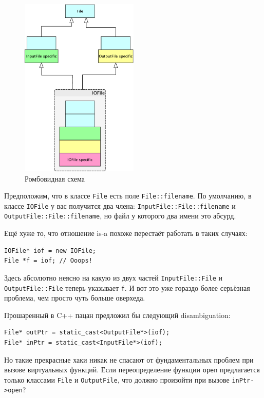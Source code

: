 \documentclass[a4paper,12pt,oneside]{article}
\begin{document}
\begin{figure}[h!]
\centering
\includegraphics[width=0.5\textwidth]{illustrations/romb-crop.pdf}
\caption{Ромбовидная схема}
\label{fig:romb-crop}
\end{figure}

Предположим, что в классе \lstinline!File! есть поле \lstinline!File::filename!. По умолчанию, в классе \lstinline!IOFile! у вас получится два члена: \lstinline!InputFile::File::filename! и \lstinline!OutputFile::File::filename!, но файл у которого два имени это абсурд. 

Ещё хуже то, что отношение is-a похоже перестаёт работать в таких случаях:

\begin{lstlisting}
IOFile* iof = new IOFile;
File *f = iof; // Ooops!
\end{lstlisting}

Здесь абсолютно неясно на какую из двух частей \lstinline!InputFile::File! и \lstinline!OutputFile::File! теперь указывает \lstinline!f!. И вот это уже гораздо более серьёзная проблема, чем просто чуть больше оверхеда.

Прошаренный в C++ пацан предложил бы следующий disambiguation:

\begin{lstlisting}
File* outPtr = static_cast<OutputFile*>(iof);
File* inPtr = static_cast<InputFile*>(iof);
\end{lstlisting}

Но такие прекрасные хаки никак не спасают от фундаментальных проблем при вызове виртуальных функций. Если переопределение функции \lstinline!open! предлагается только классами \lstinline!File! и \lstinline!OutputFile!, что должно произойти при вызове \lstinline!inPtr->open!?
\end{document}
